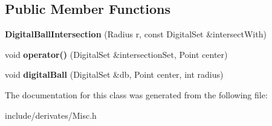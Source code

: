 \subsection*{Public Member Functions}
\begin{DoxyCompactItemize}
\item 
\mbox{\label{classDIPaCUS_1_1DigitalBallIntersection_adee67c3f6267329ad8a63014e02a2bba}} 
{\bfseries Digital\+Ball\+Intersection} (Radius r, const Digital\+Set \&intersect\+With)
\item 
\mbox{\label{classDIPaCUS_1_1DigitalBallIntersection_a9e066c4b70d15a939d256c69251a7a2a}} 
void {\bfseries operator()} (Digital\+Set \&intersection\+Set, Point center)
\item 
\mbox{\label{classDIPaCUS_1_1DigitalBallIntersection_ac6bab04131cf2d460d4ee460d863d520}} 
void {\bfseries digital\+Ball} (Digital\+Set \&db, Point center, int radius)
\end{DoxyCompactItemize}


The documentation for this class was generated from the following file\+:\begin{DoxyCompactItemize}
\item 
include/derivates/Misc.\+h\end{DoxyCompactItemize}
